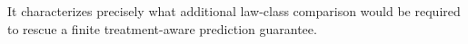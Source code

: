 It characterizes precisely what additional law-class comparison would be required to rescue a finite treatment-aware prediction guarantee.